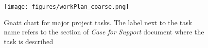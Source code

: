 \documentclass[a4paper,11point]{article}
\author{}
\date{}
\begin{document}
\begin{figure}[!t]
   \begin{center}
       \texttt{[image: figures/workPlan\_coarse.png]}

       \caption{Gnatt chart for major project tasks. The label next to the task
       name refers to the section of \emph{Case for Support} document where the
       task is described}

     \label{fig:gnattChart}
   \end{center}
\end{figure}
\end{document}
